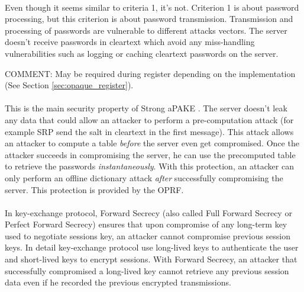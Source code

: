 \documentclass[../report.tex]{subfiles}
\begin{document}
\paragraph{}
Even though it seems similar to criteria 1, it's not. Criterion 1 is about password processing, but this criterion is about password transmission. Transmission and processing of passwords are vulnerable to different attacks vectors.
The server doesn't receive passwords in cleartext which avoid any miss-handling vulnerabilities such as logging or caching cleartext passwords on the server.

COMMENT: May be required during register depending on the implementation (See Section \ref{sec:opaque_register}).

\paragraph{} \label{sec:secure_against_pca}
This is the main security property of Strong aPAKE \cite{OPAQUE_Paper}. The server doesn't leak any data that could allow an attacker to perform a pre-computation attack (for example SRP send the salt in cleartext in the first message). This attack allows an attacker to compute a table \emph{before} the server even get compromised. Once the attacker succeeds in compromising the server, he can use the precomputed table to retrieve the passwords \emph{instantaneously}. With this protection, an attacker can only perform an offline dictionary attack \emph{after} successfully compromising the server.
This protection is provided by the OPRF. %



\paragraph{}
In key-exchange protocol, Forward Secrecy (also called Full Forward Secrecy or Perfect Forward Secrecy) ensures that upon compromise of any long-term key used to negotiate sessions key, an attacker cannot compromise previous session keys.
In detail key-exchange protocol use long-lived keys to authenticate the user and short-lived keys to encrypt sessions. With Forward Secrecy, an attacker that successfully compromised a long-lived key cannot retrieve any previous session data even if he recorded the previous encrypted transmissions. %
\end{document}
